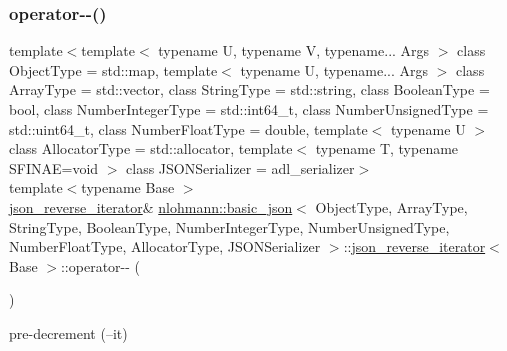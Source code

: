 \subsubsection{\texorpdfstring{operator-\/-\/()}{operator--()}\hspace{0.1cm}{\footnotesize\ttfamily [2/2]}}
{\footnotesize\ttfamily template$<$template$<$ typename U, typename V, typename... Args $>$ class Object\+Type = std\+::map, template$<$ typename U, typename... Args $>$ class Array\+Type = std\+::vector, class String\+Type  = std\+::string, class Boolean\+Type  = bool, class Number\+Integer\+Type  = std\+::int64\+\_\+t, class Number\+Unsigned\+Type  = std\+::uint64\+\_\+t, class Number\+Float\+Type  = double, template$<$ typename U $>$ class Allocator\+Type = std\+::allocator, template$<$ typename T, typename S\+F\+I\+N\+A\+E=void $>$ class J\+S\+O\+N\+Serializer = adl\+\_\+serializer$>$ \\
template$<$typename Base $>$ \\
\hyperlink{classnlohmann_1_1basic__json_1_1json__reverse__iterator}{json\+\_\+reverse\+\_\+iterator}\& \hyperlink{classnlohmann_1_1basic__json}{nlohmann\+::basic\+\_\+json}$<$ Object\+Type, Array\+Type, String\+Type, Boolean\+Type, Number\+Integer\+Type, Number\+Unsigned\+Type, Number\+Float\+Type, Allocator\+Type, J\+S\+O\+N\+Serializer $>$\+::\hyperlink{classnlohmann_1_1basic__json_1_1json__reverse__iterator}{json\+\_\+reverse\+\_\+iterator}$<$ Base $>$\+::operator-\/-\/ (\begin{DoxyParamCaption}{ }\end{DoxyParamCaption})\hspace{0.3cm}{\ttfamily [inline]}}



pre-\/decrement (--it) 

\mbox{\label{classnlohmann_1_1basic__json_1_1json__reverse__iterator_af4879af64a0f24bd308b13b859808f84}} 

